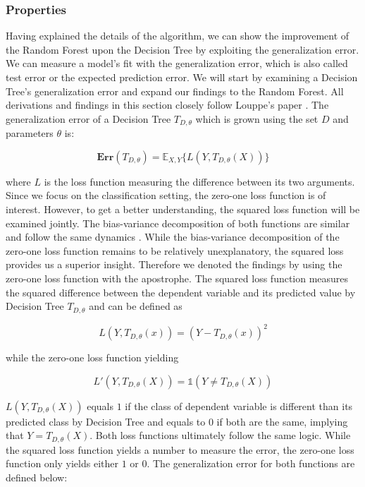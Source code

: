 \subsubsection{Properties}
Having explained the details of the algorithm, we can show the improvement of the Random Forest upon the Decision Tree 
by exploiting the generalization error.
We can measure a model's fit with the generalization error, which is also called test error or the expected prediction error.
We will start by examining a Decision Tree's generalization error and expand our findings to the Random Forest. 
All derivations and findings in this section closely follow Louppe's paper \cite{louppe2014understanding}.
The generalization error of a Decision Tree $T_{D,\theta}$ which is grown using the set $D$ and parameters $\theta$ is:

\begin{equation}
	\boldsymbol{Err}(T_{D,\theta}) = \mathbb{E}_{X,Y}\{L(Y, T_{D,\theta}(X)) \}
\end{equation}

where $L$ is the loss function measuring the difference between its two arguments. 
Since we focus on the classification setting, the zero-one loss function is of interest. 
However, to get a better understanding, the squared loss function will be examined jointly. 
The bias-variance decomposition of both functions are similar and 
follow the same dynamics \cite{domingos2000decomposition}. 
While the bias-variance decomposition of the zero-one loss function remains 
to be relatively unexplanatory, the squared loss provides us a superior insight. 
Therefore we denoted the findings by using the zero-one loss function with the apostrophe.
The squared loss function measures the squared difference between the dependent variable and its predicted value 
by Decision Tree $T_{D,\theta}$ and can be defined as

\begin{equation}
	L(Y, T_{D, \theta}(x)) = (Y - T_{D, \theta}(x))^2
\end{equation}

while the zero-one loss function yielding

\begin{equation}
	L'(Y, T_{D,\theta}(X)) = \mathds{1} (Y \neq T_{D, \theta}(X))
\end{equation}

$L(Y, T_{D,\theta}(X))$ equals $1$ if the class of dependent variable is 
different than its predicted class by Decision Tree and equals to 0 if both are the same, 
implying that $Y = T_{D, \theta}(X)$. 
Both loss functions ultimately follow the same logic.
While the squared loss function yields a number to measure the error, 
the zero-one loss function only yields either $1$ or $0$.
The generalization error for both functions are defined below:

